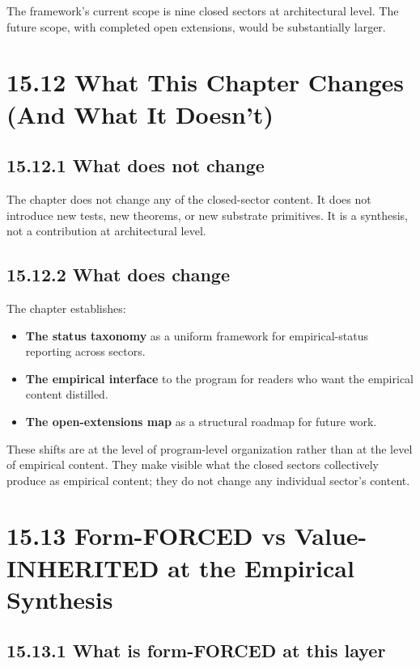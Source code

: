 \documentclass[11pt]{book}
\begin{document}
The framework's current scope is nine closed sectors at architectural level. The future scope, with completed open extensions, would be substantially larger.

\section{15.12 What This Chapter Changes (And What It Doesn't)}

\subsection{15.12.1 What does not change}

The chapter does not change any of the closed-sector content. It does not introduce new tests, new theorems, or new substrate primitives. It is a synthesis, not a contribution at architectural level.

\subsection{15.12.2 What does change}

The chapter establishes:
\begin{itemize}
\item \textbf{The status taxonomy} as a uniform framework for empirical-status reporting across sectors.
\item \textbf{The empirical interface} to the program for readers who want the empirical content distilled.
\item \textbf{The open-extensions map} as a structural roadmap for future work.
\end{itemize}

These shifts are at the level of program-level organization rather than at the level of empirical content. They make visible what the closed sectors collectively produce as empirical content; they do not change any individual sector's content.

\section{15.13 Form-FORCED vs Value-INHERITED at the Empirical Synthesis}

\subsection{15.13.1 What is form-FORCED at this layer}
\end{document}
